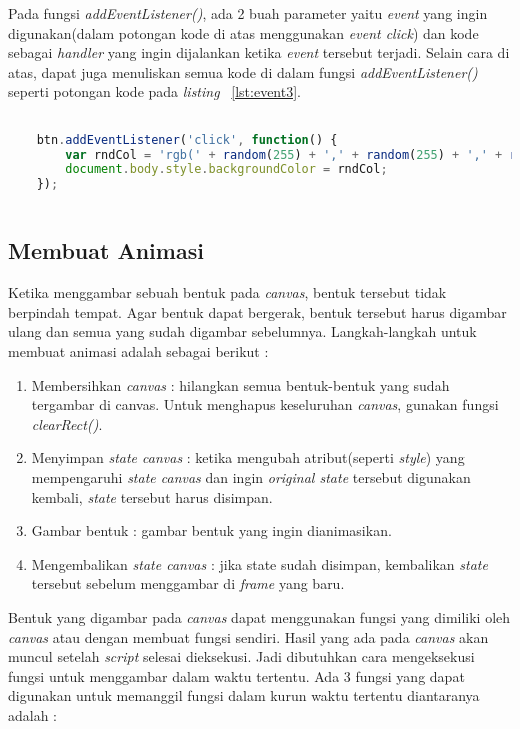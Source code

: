 Pada fungsi \textit{addEventListener()}, ada 2 buah parameter yaitu \textit{event} yang ingin digunakan(dalam potongan kode di atas menggunakan \textit{event click}) dan kode sebagai \textit{handler} yang ingin dijalankan ketika \textit{event} tersebut terjadi. Selain cara di atas, dapat juga menuliskan semua kode di dalam fungsi \textit{addEventListener()} seperti potongan kode pada \textit{listing} ~\ref{lst:event3}.

\begin{lstlisting}[language=Javascript, caption=Menuliskan kode di dalam fungsi addEventListener(), label={lst:event3}]

	btn.addEventListener('click', function() {
  		var rndCol = 'rgb(' + random(255) + ',' + random(255) + ',' + random(255) + ')';
  		document.body.style.backgroundColor = rndCol;
	});
	
\end{lstlisting}


\subsection{Membuat Animasi}
Ketika menggambar sebuah bentuk pada \textit{canvas}, bentuk tersebut tidak berpindah tempat. Agar bentuk dapat bergerak, bentuk tersebut harus digambar ulang dan semua yang sudah digambar sebelumnya. Langkah-langkah untuk membuat animasi adalah sebagai berikut :

\begin{enumerate}
	\item Membersihkan \textit{canvas} : hilangkan semua bentuk-bentuk yang sudah tergambar di canvas. Untuk menghapus keseluruhan \textit{canvas}, gunakan fungsi \textit{clearRect()}.
	\item Menyimpan \textit{state canvas} : ketika mengubah atribut(seperti \textit{style}) yang mempengaruhi \textit{state canvas} dan ingin \textit{original state} tersebut digunakan kembali, \textit{state} tersebut harus disimpan. 
	\item Gambar bentuk : gambar bentuk yang ingin dianimasikan.
	\item Mengembalikan \textit{state canvas} : jika state sudah disimpan, kembalikan \textit{state} tersebut sebelum menggambar di \textit{frame} yang baru.
\end{enumerate}

Bentuk yang digambar pada \textit{canvas} dapat menggunakan fungsi yang dimiliki oleh \textit{canvas} atau dengan membuat fungsi sendiri. Hasil yang ada pada \textit{canvas} akan muncul setelah \textit{script} selesai dieksekusi. Jadi dibutuhkan cara mengeksekusi fungsi untuk menggambar dalam waktu tertentu. Ada 3 fungsi yang dapat digunakan untuk memanggil fungsi dalam kurun waktu tertentu diantaranya adalah :

